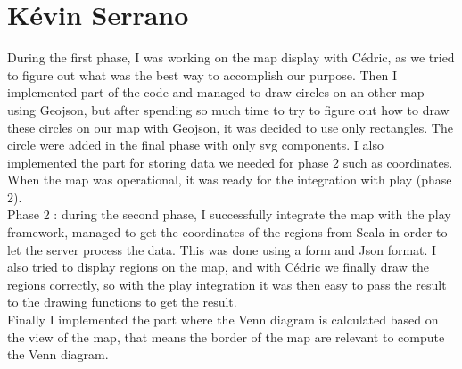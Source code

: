 \section{K\'{e}vin Serrano}

During the first phase, I was working on the map display with C\'{e}dric, as we tried to figure out what was the best way to accomplish our purpose. Then I implemented part of the code and managed to draw circles on an other map using Geojson, but after spending so much time to try to figure out how to draw these circles on our map with Geojson, it was decided to use only rectangles. The circle were added in the final phase with only svg components. I also implemented the part for storing data we needed for phase 2 such as coordinates. When the map was operational, it was ready for the integration with play (phase 2).\\
Phase 2 : during the second phase, I successfully integrate the map with the play framework, managed to get the coordinates of the regions from Scala in order to let the server process the data. This was done using a form and Json format. I also tried to display regions on the map, and with C\'{e}dric we finally draw the regions correctly, so with the play integration it was then easy to pass the result to the drawing functions to get the result.\\
Finally I implemented the part where the Venn diagram is calculated based on the view of the map, that means the border of the map are relevant to compute the Venn diagram.



